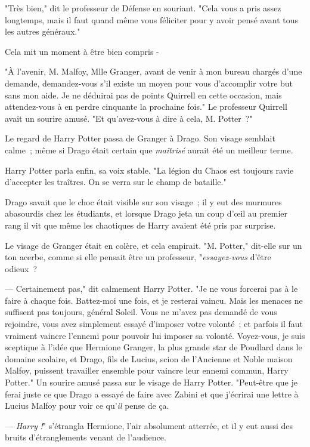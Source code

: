 "Très bien," dit le professeur de Défense en souriant. "Cela vous a pris assez longtemps, mais il faut quand même vous féliciter pour y avoir pensé avant tous les autres généraux."

Cela mit un moment à être bien compris -

"À l'avenir, M. Malfoy, Mlle Granger, avant de venir à mon bureau chargés d'une demande, demandez-vous s'il existe un moyen pour vous d'accomplir votre but sans mon aide. Je ne déduirai pas de points Quirrell en cette occasion, mais attendez-vous à en perdre cinquante la prochaine fois." Le professeur Quirrell avait un sourire amusé. "Et qu'avez-vous à dire à cela, M. Potter~?"

Le regard de Harry Potter passa de Granger à Drago. Son visage semblait calme~; même si Drago était certain que \emph{maîtrisé} aurait été un meilleur terme.

Harry Potter parla enfin, sa voix stable. "La légion du Chaos est toujours ravie d'accepter les traîtres. On se verra sur le champ de bataille."

Drago savait que le choc était visible sur son visage~; il y eut des murmures abasourdis chez les étudiants, et lorsque Drago jeta un coup d'œil au premier rang il vit que même les chaotiques de Harry avaient été pris par surprise.

Le visage de Granger était en colère, et cela empirait. "M. Potter," dit-elle sur un ton acerbe, comme si elle pensait être un professeur, "\emph{essayez-vous} d'être odieux~?

--- Certainement pas," dit calmement Harry Potter. "Je ne vous forcerai pas à le faire à chaque fois. Battez-moi une fois, et je resterai vaincu. Mais les menaces ne suffisent pas toujours, général Soleil. Vous ne m'avez pas demandé de vous rejoindre, vous avez simplement essayé d'imposer votre volonté~; et parfois il faut vraiment vaincre l'ennemi pour pouvoir lui imposer sa volonté. Voyez-vous, je suis sceptique à l'idée que Hermione Granger, la plus grande star de Poudlard dans le domaine scolaire, et Drago, fils de Lucius, scion de l'Ancienne et Noble maison Malfoy, puissent travailler ensemble pour vaincre leur ennemi commun, Harry Potter." Un sourire amusé passa sur le visage de Harry Potter. "Peut-être que je ferai juste ce que Drago a essayé de faire avec Zabini et que j'écrirai une lettre à Lucius Malfoy pour voir ce qu'\emph{il} pense de ça.

--- \emph{Harry} \emph{!}" s'étrangla Hermione, l'air absolument atterrée, et il y eut aussi des bruits d'étranglements venant de l'audience.

